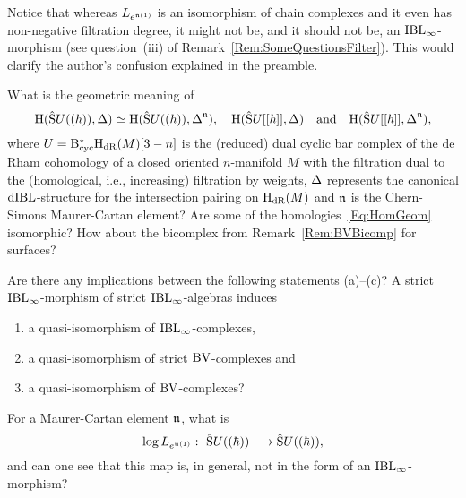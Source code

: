 \documentclass[\MainFolder/Text.tex]{subfiles}
\begin{document}
Notice that whereas $L_{e^{\mathfrak{n}(1)}}$ is an isomorphism of chain complexes and it even has non-negative filtration degree, it might not be, and it should not be, an $\mathrm{IBL}_\infty$-morphism (see question~(iii) of Remark~\ref{Rem:SomeQuestionsFilter}). This would clarify the author's confusion explained in the preamble.

\begin{Remark}\label{Rem:SomeQuestionsFilter}\begin{RemarkList}
\item What is the geometric meaning of 
\begin{equation}\label{Eq:HomGeom}
\mathrm{H}(\hat{\mathrm{S}}U((\hbar)),\operatorname{\Delta}) \simeq \mathrm{H}(\hat{\mathrm{S}}U((\hbar)),\operatorname{\Delta}^{\mathfrak{n}}), \quad\mathrm{H}(\hat{\mathrm{S}}U[[\hbar]],\operatorname{\Delta})\quad\text{and}\quad\mathrm{H}(\hat{\mathrm{S}}U[[\hbar]],\operatorname{\Delta}^{\mathfrak{n}}),
\end{equation}
where $U=\mathrm{B}_{\mathrm{cyc}}^*\mathrm{H}_{\mathrm{dR}}(M)[3-n]$ is the (reduced) dual cyclic bar complex of the de Rham cohomology of a closed oriented $n$-manifold $M$ with the filtration dual to the (homological, i.e., increasing) filtration by weights, $\operatorname{\Delta}$ represents the canonical $\mathrm{dIBL}$-structure for the intersection pairing on $\mathrm{H}_{\mathrm{dR}}(M)$ and $\mathfrak{n}$ is the Chern-Simons Maurer-Cartan element? Are some of the homologies~\eqref{Eq:HomGeom} isomorphic? How about the bicomplex from Remark~\ref{Rem:BVBicomp} for surfaces?
\item Are there any implications between the following statements (a)--(c)? A strict $\mathrm{IBL}_\infty$-morphism of strict $\mathrm{IBL}_\infty$-algebras induces
\begin{enumerate}[label=(\alph*),leftmargin=1.5cm]
\item a quasi-isomorphism of $\mathrm{IBL}_\infty$-complexes,
\item a quasi-isomorphism of strict $\mathrm{BV}$-complexes and
\item a quasi-isomorphism of $\mathrm{BV}$-complexes? 
\end{enumerate}
\item For a Maurer-Cartan element $\mathfrak{n}$, what is
\[ \log L_{e^{\PMC(1)}}:\ \hat{\Sym}U((\hbar)) \longrightarrow \hat{\Sym}U((\hbar)), \]
and can one see that this map is, in general, not in the form of an $\mathrm{IBL}_\infty$-morphism?
\qedhere
\end{RemarkList}
\end{Remark}

\end{document}
